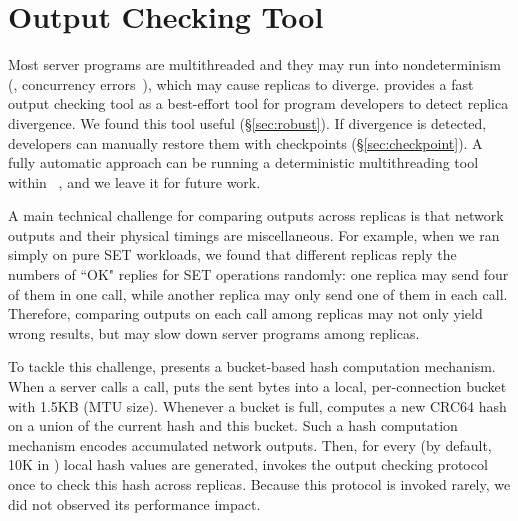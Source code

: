 \section{Output Checking Tool} \label{sec:output}

Most server programs are multithreaded and they may run into nondeterminism 
(\eg, concurrency errors~\cite{lu:concurrency-bugs}), which may cause replicas 
to diverge. \xxx provides a fast output checking tool as a best-effort tool 
for program developers to detect replica divergence. We found this 
tool useful (\S\ref{sec:robust}). If divergence is detected, developers can 
manually restore them with \xxx checkpoints (\S\ref{sec:checkpoint}). A fully 
automatic approach can be running a deterministic 
multithreading tool~\cite{parrot:sosp13,dthreads:sosp11} within 
\xxx~\cite{crane:sosp15}, and we leave it for future work.

% 

A main technical challenge for comparing outputs across replicas is that 
network outputs and their physical timings are miscellaneous. For example, when 
we ran \redis simply on pure SET workloads, we found that different replicas 
reply the numbers of ``OK" replies for SET operations randomly: one replica may 
send four of them in one \send call, while another replica may only send one of 
them in each \send call. Therefore, comparing outputs on each \send call among 
replicas may not only yield wrong results, but may slow down server programs 
among replicas.

To tackle this challenge, \xxx presents a bucket-based hash computation 
mechanism. When a server calls a \send call, \xxx puts the sent bytes into a 
local, per-connection bucket with 1.5KB (MTU size). Whenever a bucket 
is full, \xxx computes a new CRC64 hash on a union of the current hash and this 
bucket. Such a hash computation mechanism encodes accumulated network outputs. 
Then, for every \thashcomp (by default, 10K in \xxx) local hash values 
are generated, \xxx invokes the output checking protocol once to check this 
hash across replicas. Because this protocol is invoked rarely, we did not 
observed its performance impact.

